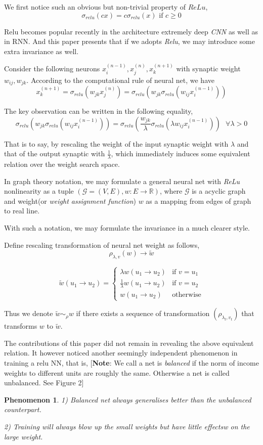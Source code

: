 \documentclass[10pt,a4paper]{article}
\newtheorem{pheno}{Phenomenon}
\begin{document}
We first notice such an obvious but non-trivial property of $ReLu$,
$$
	\sigma_{relu}(cx) = c\sigma_{relu}(x) \text{ if }c\geq{0}
$$

Relu becomes popular recently in the architecture extremely deep \textit{CNN} as well as in RNN. And this paper presents that if we adopts \textit{Relu}, we may introduce some extra invariance as well.

Consider the following neurons $x_i^{(n-1)},x_j^{(n)},x_k^{(n+1)}$ with synaptic weight $w_{ij}, w_{jk}$. According to the computational rule of neural net, we have 
$$
	x_k^{(n+1)} = \sigma_{relu}(w_{jk}x_j^{(n)}) =\sigma_{relu}(w_{jk}\sigma_{relu}(w_{ij}x_i^{(n-1)}))
$$

The key observation can be written in the following equality,
$$
	\sigma_{relu}(w_{jk}\sigma_{relu}(w_{ij}x_i^{(n-1)})) = \sigma_{relu}(\frac{w_{jk}}{\lambda}\sigma_{relu}(\lambda{w}_{ij}x_i^{(n-1)})) \text{  } \forall{\lambda>0}
$$

That is to say, by rescaling the weight of the input synaptic weight with $\lambda$ and that of the output synaptic with $\frac{1}{\lambda}$, which immediately induces some equivalent relation over the weight search space.

In graph theory notation, we may formulate a general neural net with \textit{ReLu} nonlinearity as a tuple $(\mathcal{G}=(V,E), w:E\to\mathbb{R})$, where $\mathcal{G}$ is a acyclic graph and weight(or \textit{weight assignment function}) $w$ as a mapping from edges of graph to real line.

With such a notation, we may formulate the invariance in a much clearer style.

Define rescaling transformation of neural net weight as follows,
$$
	\rho_{\lambda,v}(w) \to \tilde{w}
$$

\[
 \tilde{w}(u_1\to{u_2}) = 
  \begin{cases} 
  \lambda{w(u_1\to{u_2})} & \text{if } v=u_1 \\
   \frac{1}{\lambda}{w(u_1\to{u_2})}       & \text{if } v=u_2  \\
   w(u_1\to{u_2}) & \text{otherwise}
  \end{cases}
\]

Thus we denote $\tilde{w}\sim_{\rho}{w}$ if there exists a sequence of transformation $(\rho_{\lambda_{t},v_{t}})$ that transforms $w$ to $\tilde{w}$.

The contributions of this paper did not remain in revealing the above equivalent relation. It however noticed another seemingly independent phenomenon in training a relu NN, that is, 
[\textbf{Note}: 	We call a net is \textit{balanced} if the norm of income weights to different units are roughly the same. Otherwise a net is called unbalanced. See Figure 2\cite{Neyshabur201506}]
\begin{pheno}
	1) Balanced net always generalises better than the unbalanced counterpart.
	
	2) Training will always blow up the small weights but have little effectsw on the large weight.
\end{pheno}
\end{document}
